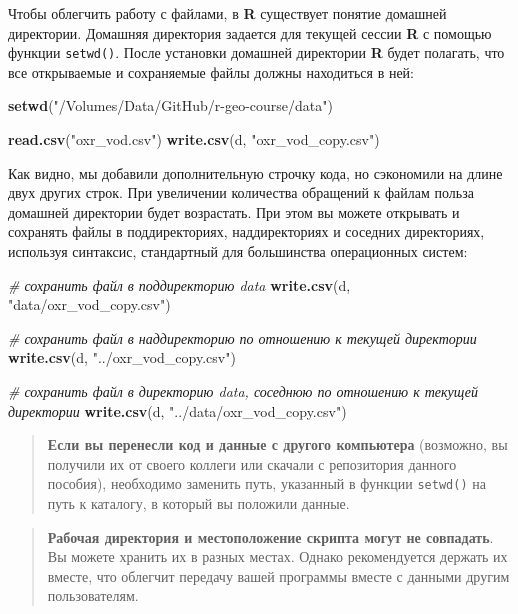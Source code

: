 \documentclass[]{book}
\newenvironment{Shaded}{\begin{snugshade}}{\end{snugshade}}
\newcommand{\KeywordTok}[1]{\textcolor[rgb]{0.13,0.29,0.53}{\textbf{#1}}}
\newcommand{\StringTok}[1]{\textcolor[rgb]{0.31,0.60,0.02}{#1}}
\newcommand{\CommentTok}[1]{\textcolor[rgb]{0.56,0.35,0.01}{\textit{#1}}}
\newcommand{\NormalTok}[1]{#1}
\begin{document}
Чтобы облегчить работу с файлами, в \textbf{R} существует понятие
домашней директории. Домашняя директория задается для текущей сессии
\textbf{R} с помощью функции \texttt{setwd()}. После установки домашней
директории \textbf{R} будет полагать, что все открываемые и сохраняемые
файлы должны находиться в ней:

\begin{Shaded}
\begin{Highlighting}[]
\KeywordTok{setwd}\NormalTok{(}\StringTok{"/Volumes/Data/GitHub/r-geo-course/data"}\NormalTok{)}

\KeywordTok{read.csv}\NormalTok{(}\StringTok{"oxr_vod.csv"}\NormalTok{)}
\KeywordTok{write.csv}\NormalTok{(d, }\StringTok{"oxr_vod_copy.csv"}\NormalTok{)}
\end{Highlighting}
\end{Shaded}

Как видно, мы добавили дополнительную строчку кода, но сэкономили на
длине двух других строк. При увеличении количества обращений к файлам
польза домашней директории будет возрастать. При этом вы можете
открывать и сохранять файлы в поддиректориях, наддиректориях и соседних
директориях, используя синтаксис, стандартный для большинства
операционных систем:

\begin{Shaded}
\begin{Highlighting}[]
\CommentTok{# сохранить файл в поддиректорию data}
\KeywordTok{write.csv}\NormalTok{(d, }\StringTok{"data/oxr_vod_copy.csv"}\NormalTok{)}

\CommentTok{# сохранить файл в наддиректорию по отношению к текущей директории}
\KeywordTok{write.csv}\NormalTok{(d, }\StringTok{"../oxr_vod_copy.csv"}\NormalTok{)}

\CommentTok{# сохранить файл в директорию data, соседнюю по отношению к текущей директории}
\KeywordTok{write.csv}\NormalTok{(d, }\StringTok{"../data/oxr_vod_copy.csv"}\NormalTok{)}
\end{Highlighting}
\end{Shaded}

\begin{quote}
\textbf{Если вы перенесли код и данные с другого компьютера} (возможно,
вы получили их от своего коллеги или скачали с репозитория данного
пособия), необходимо заменить путь, указанный в функции \texttt{setwd()}
на путь к каталогу, в который вы положили данные.
\end{quote}

\begin{quote}
\textbf{Рабочая директория и местоположение скрипта могут не совпадать}.
Вы можете хранить их в разных местах. Однако рекомендуется держать их
вместе, что облегчит передачу вашей программы вместе с данными другим
пользователям.
\end{quote}
\end{document}
